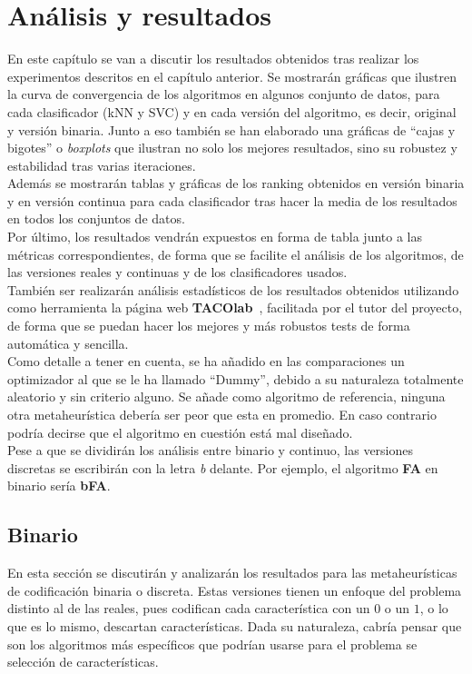 \chapter{Análisis y resultados}
En este capítulo se van a discutir los resultados obtenidos tras realizar los experimentos descritos en el capítulo anterior. Se mostrarán gráficas que ilustren la curva de convergencia de los algoritmos en algunos conjunto de datos, para cada clasificador (kNN y SVC) y en cada versión del algoritmo, es decir, original y versión binaria. Junto a eso también se han elaborado una gráficas de ``cajas y bigotes'' o \textit{boxplots} que ilustran no solo los mejores resultados, sino su robustez y estabilidad tras varias iteraciones. \\[6pt]
Además se mostrarán tablas y gráficas de los ranking obtenidos en versión binaria y en versión continua para cada clasificador tras hacer la media de los resultados en todos los conjuntos de datos.\\[6pt]
Por último, los resultados vendrán expuestos en forma de tabla junto a las métricas correspondientes, de forma que se facilite el análisis de los algoritmos, de las versiones reales y continuas y de los clasificadores usados.\\[6pt]
También ser realizarán análisis estadísticos de los resultados obtenidos utilizando como herramienta la página web \textbf{TACOlab}~\cite{taco_website}, facilitada por el tutor del proyecto, de forma que se puedan hacer los mejores y más robustos tests de forma automática y sencilla.\\[6pt]
Como detalle a tener en cuenta, se ha añadido en las comparaciones un optimizador al que se le ha llamado ``Dummy'', debido a su naturaleza totalmente aleatorio y sin criterio alguno. Se añade como algoritmo de referencia, ninguna otra metaheurística debería ser peor que esta en promedio. En caso contrario podría decirse que el algoritmo en cuestión está mal diseñado.\\[6pt]
Pese a que se dividirán los análisis entre binario y continuo, las versiones discretas se escribirán con la letra \textit{b} delante. Por ejemplo, el algoritmo \textbf{FA} en binario sería \textbf{bFA}.

\section{Binario}
En esta sección se discutirán y analizarán los resultados para las metaheurísticas de codificación binaria o discreta. Estas versiones tienen un enfoque del problema distinto al de las reales, pues codifican cada característica con un $0$ o un $1$, o lo que es lo mismo, descartan características. Dada su naturaleza, cabría pensar que son los algoritmos más específicos que podrían usarse para el problema se selección de características.

